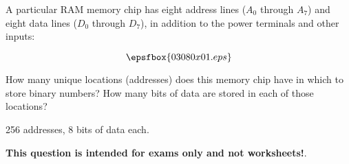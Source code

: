

A particular RAM memory chip has eight address lines ($A_0$ through $A_7$) and eight data lines ($D_0$ through $D_7$), in addition to the power terminals and other inputs:

$$\epsfbox{03080x01.eps}$$

How many unique locations (addresses) does this memory chip have in which to store binary numbers?  How many bits of data are stored in each of those locations?







256 addresses, 8 bits of data each.







{\bf This question is intended for exams only and not worksheets!}.




